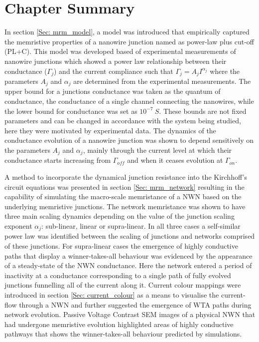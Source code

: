 \section{Chapter Summary}
\label{Sec: mrm_conclusion}
In section \ref{Sec: mrm_model}, a model was introduced that empirically captured the memristive properties of a nanowire junction named as power-law plus cut-off (PL+C). This model was developed based of experimental measurements of nanowire junctions which showed a power law relationship between their conductance ($\Gamma_j$) and the current compliance such that $\Gamma_j = A_j I^{\alpha_j}$ where the parameters $A_j$ and $\alpha_j$ are determined from the experimental measurements. The upper bound for a junctions conductance was taken as the quantum of conductance, the conductance of a single channel connecting the nanowires, while the lower bound for conductance was set as $10^{-7}~ S$. These bounds are not fixed parameters and can be changed in accordance with the system being studied, here they were motivated by experimental data. The dynamics of the conductance evolution of a nanowire junction was shown to depend sensitively on the parameters $A_j$ and $\alpha_j$, mainly through the current level at which their conductance starts increasing from $\Gamma_{off}$ and when it ceases evolution at $\Gamma_{on}$.

A method to incorporate the dynamical junction resistance into the Kirchhoff's circuit equations was presented in section \ref{Sec: mrm_network} resulting in the capability of simulating the macro-scale memristance of a NWN based on the underlying memristive junctions. The network memristance was shown to have three main scaling dynamics depending on the value of the junction scaling exponent $\alpha_j$: sub-linear, linear or supra-linear. In all three cases a self-similar power law was identified between the scaling of junctions and networks comprised of these junctions. For supra-linear cases the emergence of highly conductive paths that display a winner-takes-all behaviour was evidenced by the appearance of a steady-state of the NWN conductance. Here the network entered a period of inactivity at a conductance corresponding to a single path of fully evolved junctions funnelling all of the current along it. Current colour mappings were introduced in section \ref{Sec: current_colour} as a means to visualise the current-flow through a NWN and further suggested the emergence of WTA paths during network evolution. Passive Voltage Contrast SEM images of a physical NWN that had undergone memristive evolution highlighted areas of highly conductive pathways that shows the winner-takes-all behaviour predicted by simulations.


